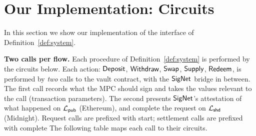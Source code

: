 

\section{Our Implementation: Circuits}
\label{sec:instantiation}

In this section we show our implementation of the interface of Definition~\ref{def:system}.

\noindent
\textbf{Two calls per flow.}
Each procedure of Definition~\ref{def:system} is performed by the circuits below.
Each action: $\mathsf{Deposit}$, $\mathsf{Withdraw}$,  $\mathsf{Swap}$, $\mathsf{Supply}$, $\mathsf{Redeem}$, is performed by \emph{two} calls to the vault contract, with the $\mathsf{SigNet}$ bridge in
between. The first call records what the MPC should sign and takes
the values relevant to the call (transaction parameters). The second presents $\mathsf{SigNet}$'s attestation of what
happened on $\mathcal{L}_{\mathsf{pub}}$ (Ethereum), and complete the request on $\mathcal{L}_{\mathsf{shd}}$ (Midnight). Request calls are prefixed with \textsf{start}; settlement calls are prefixed with \textsf{complete}
The following table maps each call to their circuits.


